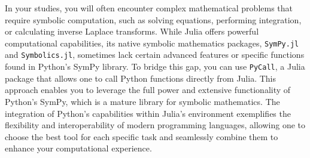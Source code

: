 \begin{rem} In your studies, you will often encounter complex mathematical problems that require symbolic computation, such as solving equations, performing integration, or calculating inverse Laplace transforms. While Julia offers powerful computational capabilities, its native symbolic mathematics packages, \texttt{SymPy.jl} and \texttt{Symbolics.jl}, sometimes lack certain advanced features or specific functions found in Python's SymPy library. To bridge this gap, you can use \texttt{PyCall}, a Julia package that allows one to call Python functions directly from Julia. This approach enables you to leverage the full power and extensive functionality of Python's SymPy, which is a mature library for symbolic mathematics. The integration of Python's capabilities within Julia's environment exemplifies the flexibility and interoperability of modern programming languages, allowing one to choose the best tool for each specific task and seamlessly combine them to enhance your computational experience.  
\end{rem}

\vspace*{.2cm} 

